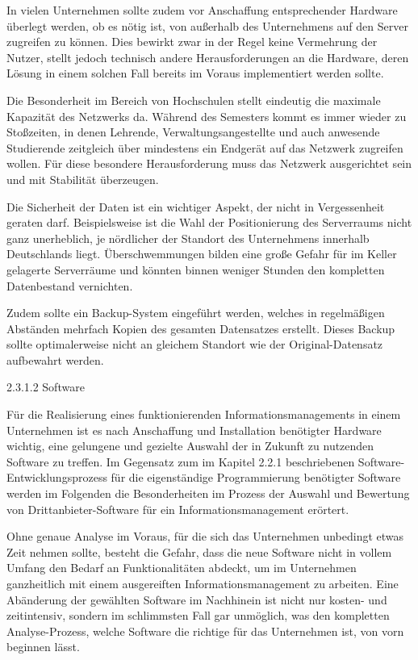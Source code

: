 \documentclass{article}
\begin{document}
\bigskip

In vielen Unternehmen sollte zudem vor Anschaffung entsprechender Hardware überlegt werden, ob es nötig ist, von
außerhalb des Unternehmens auf den Server zugreifen zu können. Dies bewirkt zwar in der Regel keine Vermehrung der
Nutzer, stellt jedoch technisch andere Herausforderungen an die Hardware, deren Lösung in einem solchen Fall bereits im
Voraus implementiert werden sollte.


\bigskip

Die Besonderheit im Bereich von Hochschulen stellt eindeutig die maximale Kapazität des Netzwerks da. Während des
Semesters kommt es immer wieder zu Stoßzeiten, in denen Lehrende, Verwaltungsangestellte und auch anwesende Studierende
zeitgleich über mindestens ein Endgerät auf das Netzwerk zugreifen wollen. Für diese besondere Herausforderung muss das
Netzwerk ausgerichtet sein und mit Stabilität überzeugen. 


\bigskip

Die Sicherheit der Daten ist ein wichtiger Aspekt, der nicht in Vergessenheit geraten darf. Beispielsweise ist die Wahl
der Positionierung des Serverraums nicht ganz unerheblich, je nördlicher der Standort des Unternehmens innerhalb
Deutschlands liegt. Überschwemmungen bilden eine große Gefahr für im Keller gelagerte Serverräume und könnten binnen
weniger Stunden den kompletten Datenbestand vernichten. 


\bigskip

Zudem sollte ein Backup-System eingeführt werden, welches in regelmäßigen Abständen mehrfach Kopien des gesamten
Datensatzes erstellt. Dieses Backup sollte optimalerweise nicht an gleichem Standort wie der Original-Datensatz
aufbewahrt werden. 


\bigskip

2.3.1.2 Software


\bigskip

Für die Realisierung eines funktionierenden Informationsmanagements in einem Unternehmen ist es nach Anschaffung und
Installation benötigter Hardware wichtig, eine gelungene und gezielte Auswahl der in Zukunft zu nutzenden Software zu
treffen. Im Gegensatz zum im Kapitel 2.2.1 beschriebenen Software-Entwicklungsprozess für die eigenständige
Programmierung benötigter Software werden im Folgenden die Besonderheiten im Prozess der Auswahl und Bewertung von
Drittanbieter-Software für ein Informationsmanagement erörtert. 


\bigskip

Ohne genaue Analyse im Voraus, für die sich das Unternehmen unbedingt etwas Zeit nehmen sollte, besteht die Gefahr, dass
die neue Software nicht in vollem Umfang den Bedarf an Funktionalitäten abdeckt, um im Unternehmen ganzheitlich mit
einem ausgereiften Informationsmanagement zu arbeiten. Eine Abänderung der gewählten Software im Nachhinein ist nicht
nur kosten- und zeitintensiv, sondern im schlimmsten Fall gar unmöglich, was den kompletten Analyse-Prozess, welche
Software die richtige für das Unternehmen ist, von vorn beginnen lässt. 
\end{document}
